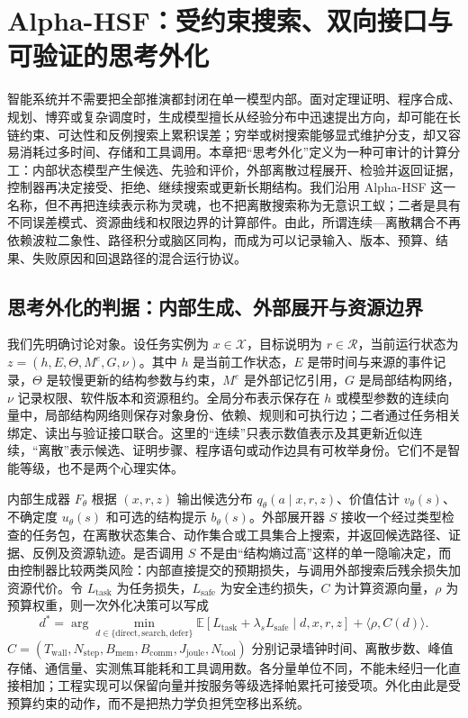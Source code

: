 \chapter{Alpha-HSF：受约束搜索、双向接口与可验证的思考外化}
\label{chp:alpha_hsf_architecture}

智能系统并不需要把全部推演都封闭在单一模型内部。面对定理证明、程序合成、规划、博弈或复杂调度时，生成模型擅长从经验分布中迅速提出方向，却可能在长链约束、可达性和反例搜索上累积误差；穷举或树搜索能够显式维护分支，却又容易消耗过多时间、存储和工具调用。本章把“思考外化”定义为一种可审计的计算分工：内部状态模型产生候选、先验和评价，外部离散过程展开、检验并返回证据，控制器再决定接受、拒绝、继续搜索或更新长期结构。我们沿用 Alpha-HSF 这一名称，但不再把连续表示称为灵魂，也不把离散搜索称为无意识工蚁；二者是具有不同误差模式、资源曲线和权限边界的计算部件。由此，所谓连续—离散耦合不再依赖波粒二象性、路径积分或脑区同构，而成为可以记录输入、版本、预算、结果、失败原因和回退路径的混合运行协议。

\section{思考外化的判据：内部生成、外部展开与资源边界}
\label{sec:alpha_hsf_thermodynamic_boundaries}

我们先明确讨论对象。设任务实例为 $x\in\mathcal{X}$，目标说明为 $r\in\mathcal{R}$，当前运行状态为 $z=(h,E,\Theta,M^e,G,\nu)$。其中 $h$ 是当前工作状态，$E$ 是带时间与来源的事件记录，$\Theta$ 是较慢更新的结构参数与约束，$M^e$ 是外部记忆引用，$G$ 是局部结构网络，$\nu$ 记录权限、软件版本和资源租约。全局分布表示保存在 $h$ 或模型参数的连续向量中，局部结构网络则保存对象身份、依赖、规则和可执行边；二者通过任务相关绑定、读出与验证接口联合。这里的“连续”只表示数值表示及其更新近似连续，“离散”表示候选、证明步骤、程序语句或动作边具有可枚举身份。它们不是智能等级，也不是两个心理实体。

内部生成器 $F_{\theta}$ 根据 $(x,r,z)$ 输出候选分布 $q_{\theta}(a\mid x,r,z)$、价值估计 $v_{\theta}(s)$、不确定度 $u_{\theta}(s)$ 和可选的结构提示 $b_{\theta}(s)$。外部展开器 $S$ 接收一个经过类型检查的任务包，在离散状态集合、动作集合或工具集合上搜索，并返回候选路径、证据、反例及资源轨迹。是否调用 $S$ 不是由“结构熵过高”这样的单一隐喻决定，而由控制器比较两类风险：内部直接提交的预期损失，与调用外部搜索后残余损失加资源代价。令 $L_{\mathrm{task}}$ 为任务损失，$L_{\mathrm{safe}}$ 为安全违约损失，$C$ 为计算资源向量，$\rho$ 为预算权重，则一次外化决策可以写成
\[
d^*=\arg\min_{d\in\{\mathrm{direct},\mathrm{search},\mathrm{defer}\}}
\mathbb{E}[L_{\mathrm{task}}+\lambda_sL_{\mathrm{safe}}\mid d,x,r,z]
+\langle\rho,C(d)\rangle .
\]
$C=(T_{\mathrm{wall}},N_{\mathrm{step}},B_{\mathrm{mem}},B_{\mathrm{comm}},J_{\mathrm{joule}},N_{\mathrm{tool}})$ 分别记录墙钟时间、离散步数、峰值存储、通信量、实测焦耳能耗和工具调用数。各分量单位不同，不能未经归一化直接相加；工程实现可以保留向量并按服务等级选择帕累托可接受项。外化由此是受预算约束的动作，而不是把热力学负担凭空移出系统。

